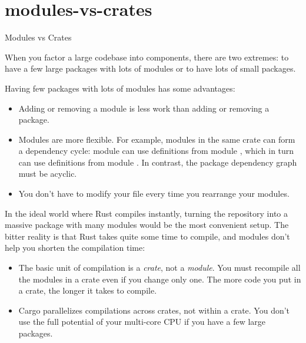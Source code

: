 \documentclass{article}
\begin{document}
\begin{description}
\end{description}

\section{modules-vs-crates}{Modules vs Crates}

When you factor a large codebase into components, there are two extremes:
to have a few large packages with lots of modules or
to have lots of small packages.

Having few packages with lots of modules has some advantages:
\begin{itemize}
  \item
    Adding or removing a module is less work than adding or removing a package.
  \item
    Modules are more flexible.
    For example, modules in the same crate can form a dependency cycle: module  can use definitions from module , which in turn can use definitions from module .
    In contrast, the package dependency graph must be acyclic.
  \item
    You don't have to modify your  file every time you rearrange your modules.
\end{itemize}

In the ideal world where Rust compiles instantly, turning the repository into a massive package with many modules would be the most convenient setup.
The bitter reality is that Rust takes quite some time to compile, and modules don't help you shorten the compilation time:
\begin{itemize}
\item
  The basic unit of compilation is a \emph{crate}, not a \emph{module}.
  You must recompile all the modules in a crate even if you change only one.
  The more code you put in a crate, the longer it takes to compile.
\item
  Cargo parallelizes compilations across crates, not within a crate.
  You don't use the full potential of your multi-core CPU if you have a few large packages.
\end{itemize}
\end{document}
